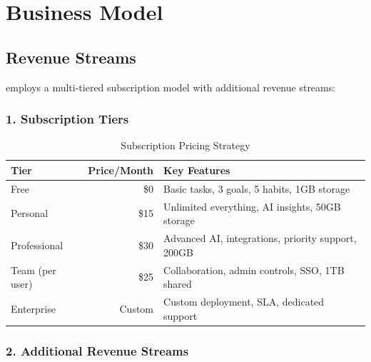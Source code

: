 
\section{Business Model}

\subsection{Revenue Streams}

\lifeos{} employs a multi-tiered subscription model with additional revenue streams:

\subsubsection{1. Subscription Tiers}

\begin{table}[H]
\centering
\caption{Subscription Pricing Strategy}
\begin{tabular}{|l|r|p{6cm}|}
\hline
\rowcolor{lightgray}
\textbf{Tier} & \textbf{Price/Month} & \textbf{Key Features} \\
\hline
Free & \$0 & Basic tasks, 3 goals, 5 habits, 1GB storage \\
\hline
Personal & \$15 & Unlimited everything, AI insights, 50GB storage \\
\hline
Professional & \$30 & Advanced AI, integrations, priority support, 200GB \\
\hline
Team (per user) & \$25 & Collaboration, admin controls, SSO, 1TB shared \\
\hline
Enterprise & Custom & Custom deployment, SLA, dedicated support \\
\hline
\end{tabular}
\end{table}

\subsubsection{2. Additional Revenue Streams}

